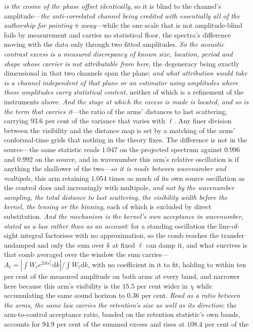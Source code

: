 \documentclass[11pt,a4paper]{article}
\theoremstyle{plain}
\theoremstyle{definition}
\theoremstyle{remark}
\newcommand{\rs}{r_{\mathrm{s}}}
\newcommand{\dd}{\mathrm{d}}   %
\begin{document}
\begin{enumerate}
\emph{is the cosine of the phase offset identically}, so it is blind to the channel's amplitude---\emph{the anti-correlated channel being credited with essentially all of the authorship for pointing $\pi$ away}---while the one scale that is not amplitude-blind fails by measurement and carries no statistical floor, the spectra's difference moving with the data only through two fitted amplitudes. \emph{So the acoustic contrast excess is a measured discrepancy of known size, location, period and shape whose carrier is not attributable from here}, the degeneracy being exactly dimensional in that two channels span the plane; \emph{and what attribution would take is a channel independent of that plane or an estimator using amplitudes where those amplitudes carry statistical content}, neither of which is a refinement of the instruments above. \emph{And the stage at which the excess is made is located, and so is the term that carries it}---the ratio of the arms' distances to last scattering, carrying $93.6$ per cent of the variance that varies with $\ell$. Any finer division between the visibility and the distance map is set by a matching of the arms' conformal-time grids that nothing in the theory fixes. The difference is not in the source---the same statistic reads $1.047$ on the projected spectrum against $0.996$ and $0.992$ on the source, and in wavenumber this arm's relative oscillation is if anything the shallower of the two---\emph{so it is made between wavenumber and multipole}, this arm retaining $1.054$ times as much of its own source oscillation as the control does and increasingly with multipole, \emph{and not by the wavenumber sampling, the total distance to last scattering, the visibility width before the kernel, the lensing or the binning}, each of which is excluded by direct substitution. \emph{And the mechanism is the kernel's own acceptance in wavenumber, stated as a law rather than as an account}: for a standing oscillation the line-of-sight integral factorises with no approximation, so the comb reaches the transfer undamped and only the sum over $k$ at fixed $\ell$ can damp it, and what survives is that comb averaged over the window the sum carries---$A_{\ell}=|\!\int\!W_{\ell}e^{2ik\rs^{*}}\dd k|/\!\int\!W_{\ell}\dd k$, with no coefficient in it to fit, holding to within ten per cent of the measured amplitude on both arms at every band, and narrower here because this arm's visibility is the $15.5$ per cent wider in $\chi$ while accumulating the same sound horizon to $0.36$ per cent. \emph{Read as a ratio between the arms, the same law carries the retention's size as well as its direction}: the arm-to-control acceptance ratio, banded on the retention statistic's own bands, accounts for $94.9$ per cent of the summed excess and rises at $108.4$ per cent of the 
\end{enumerate}
\end{document}
